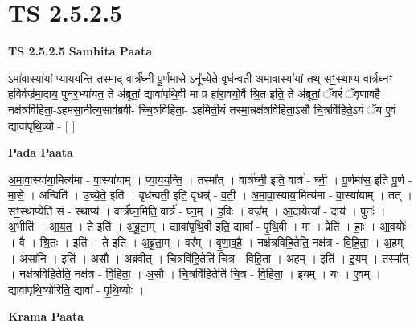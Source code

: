 \documentclass[17pt]{extarticle}
\begin{document}
\section{ TS 2.5.2.5 }

\textbf{TS 2.5.2.5 } \newline
\textbf{Samhita Paata} \newline

ऽमा॑वा॒स्या॑यां प्याययन्ति॒ तस्मा॒द्-वार्त्र॑घ्नी पू॒र्णमा॒से ऽनू᳚च्येते॒ वृध॑न्वती अमावा॒स्या॑यां॒ तथ् सꣳ॒॒स्थाप्य॒ वार्त्र॑घ्नꣳ ह॒विर्वज्र॑मा॒दाय॒ पुन॑र॒भ्या॑यत॒ ते अ॑ब्रूतां॒ द्यावा॑पृथि॒वी मा प्र हा॑रा॒वयो॒र्वै श्रि॒त इति॒ ते अ॑ब्रूतां॒ ॅवरं॑ ॅवृणावहै॒ नक्ष॑त्रविहिता॒-ऽहमसा॒नीत्य॒साव॑ब्रवी- च्चि॒त्रवि॑हिता॒- ऽहमिती॒यं तस्मा॒न्नक्ष॑त्रविहिता॒ऽसौ चि॒त्रवि॑हिते॒ऽयं ॅय ए॒वं द्यावा॑पृथि॒व्यो - [  ] \newline

\textbf{Pada Paata} \newline

अ॒मा॒वा॒स्या॑या॒मित्य॑मा - वा॒स्या॑याम् । प्या॒य॒य॒न्ति॒ । तस्मा᳚त् । वार्त्र॑घ्नी॒ इति॒ वार्त्र॑ - घ्नी॒ । पू॒र्णमा॑स॒ इति॑ पू॒र्ण - मा॒से॒ । अन्विति॑ । उ॒च्ये॒ते॒ इति॑ । वृध॑न्वती॒ इति॒ वृधन्न्॑ - व॒ती॒ । अ॒मा॒वा॒स्या॑या॒मित्य॑मा - वा॒स्या॑याम् । तत् । सꣳ॒॒स्थाप्येति॑ सं - स्थाप्य॑ । वार्त्र॑घ्न॒मिति॒ वार्त्र॑ - घ्न॒म् । ह॒विः । वज्र᳚म् । आ॒दायेत्या᳚ - दाय॑ । पुनः॑ । अ॒भीति॑ । आ॒य॒त॒ । ते इति॑ । अ॒ब्रू॒ता॒म् । द्यावा॑पृथि॒वी इति॒ द्यावा᳚ - पृ॒थि॒वी । मा । प्रेति॑ । हाः॒ । आ॒वयोः᳚ । वै । श्रि॒तः । इति॑ । ते इति॑ । अ॒ब्रू॒ता॒म् । वर᳚म् । वृ॒णा॒व॒है॒ । नक्ष॑त्रविहि॒तेति॒ नक्ष॑त्र - वि॒हि॒ता॒ । अ॒हम् । असा॑नि । इति॑ । अ॒सौ । अ॒ब्र॒वी॒त् । चि॒त्रवि॑हि॒तेति॑ चि॒त्र - वि॒हि॒ता॒ । अ॒हम् । इति॑ । इ॒यम् । तस्मा᳚त् । नक्ष॑त्रविहि॒तेति॒ नक्ष॑त्र - वि॒हि॒ता॒ । अ॒सौ । चि॒त्रवि॑हि॒तेति॑ चि॒त्र - वि॒हि॒ता॒ । इ॒यम् । यः । ए॒वम् । द्यावा॑पृथि॒व्योरिति॒ द्यावा᳚ - पृ॒थि॒व्योः ।  \newline


\textbf{Krama Paata} \newline
\end{document}
